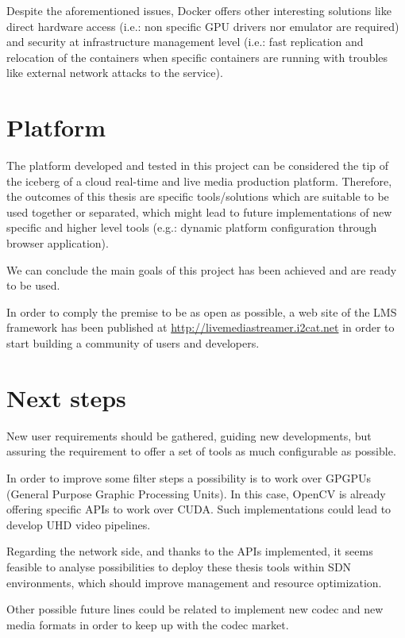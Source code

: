 Despite the aforementioned issues, Docker offers other interesting solutions like direct hardware access (i.e.: non specific GPU drivers nor emulator are required) and security at infrastructure management level (i.e.: fast replication and relocation of the containers when specific containers are running with troubles like external network attacks to the service). 

\section{Platform}

The platform developed and tested in this project can be considered the tip of the iceberg of a cloud real-time and live media production platform. Therefore, the outcomes of this thesis are specific tools/solutions which are suitable to be used together or separated, which might lead to future implementations of new specific and higher level tools (e.g.: dynamic platform configuration through browser application). 

We can conclude the main goals of this project has been achieved and are ready to be used.

In order to comply the premise to be as open as possible, a web site of the LMS framework has been published  at \href{http://livemediastreamer.i2cat.net}{http://livemediastreamer.i2cat.net} in order to start building a community of users and developers.

\section{Next steps}

New user requirements should be gathered, guiding new developments, but assuring the requirement to offer a set of tools as much configurable as possible.

In order to improve some filter steps a possibility is to work over GPGPUs (General Purpose Graphic Processing Units). In this case, OpenCV is already offering specific APIs to work over CUDA. Such implementations could lead to develop UHD video pipelines.

Regarding the network side, and thanks to the APIs implemented, it seems feasible to analyse possibilities to deploy these thesis tools within SDN environments, which should improve management and resource optimization.

Other possible future lines could be related to implement new codec and new media formats in order to keep up with the codec market.

